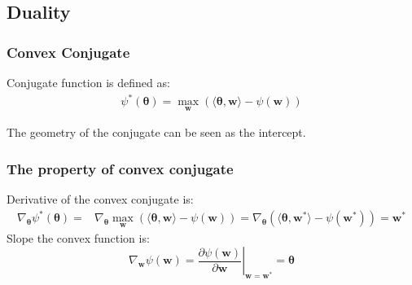 \documentclass[11pt]{article}
\DeclareMathOperator*{\maximize}{max}
\newcommand{\btheta}{\boldsymbol{\theta}}
\newcommand{\bw}{\boldsymbol{w}}
\begin{document}
\subsection{Duality}


\subsubsection{Convex Conjugate}
Conjugate function is defined as:
\begin{align}
\psi^* (\btheta) = \maximize_{\bw} \left( \langle \btheta, \bw\rangle - \psi (\bw) \right) \nonumber
\end{align}

% 


The geometry of the conjugate can be seen as the intercept.


\subsubsection{The property of convex conjugate}
Derivative of the convex conjugate is:
\begin{align}
\nabla_{\btheta} \psi^* (\btheta) = & \nabla_{\btheta} \maximize_{\bw} \left( \langle \btheta, \bw \rangle - \psi (\bw)\right) \nonumber
= \nabla_{\btheta} \left( \langle \btheta, \bw^* \rangle - \psi (\bw^*)\right) \nonumber
= \bw^* \nonumber
\end{align}
Slope the convex function is:
$$\nabla_{\bw} \psi (\bw) = \left. \frac{\partial \psi (\bw)}{\partial \bw} \right|_{\bw=\bw^*} = \btheta$$
\end{document}
